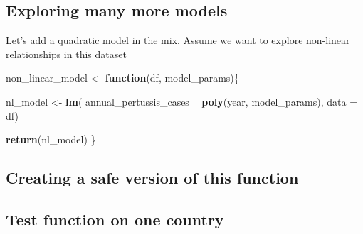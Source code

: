 \documentclass[]{article}
\newenvironment{Shaded}{\begin{snugshade}}{\end{snugshade}}
\newcommand{\KeywordTok}[1]{\textcolor[rgb]{0.13,0.29,0.53}{\textbf{#1}}}
\newcommand{\DataTypeTok}[1]{\textcolor[rgb]{0.13,0.29,0.53}{#1}}
\newcommand{\DecValTok}[1]{\textcolor[rgb]{0.00,0.00,0.81}{#1}}
\newcommand{\StringTok}[1]{\textcolor[rgb]{0.31,0.60,0.02}{#1}}
\newcommand{\ControlFlowTok}[1]{\textcolor[rgb]{0.13,0.29,0.53}{\textbf{#1}}}
\newcommand{\OperatorTok}[1]{\textcolor[rgb]{0.81,0.36,0.00}{\textbf{#1}}}
\newcommand{\NormalTok}[1]{#1}
\begin{document}
\subsection{Exploring many more
models}\label{exploring-many-more-models}

Let's add a quadratic model in the mix. Assume we want to explore
non-linear relationships in this dataset

\begin{Shaded}
\begin{Highlighting}[]
\NormalTok{non_linear_model <-}\StringTok{ }\ControlFlowTok{function}\NormalTok{(df, model_params)\{}
  
\NormalTok{  nl_model <-}\StringTok{ }\KeywordTok{lm}\NormalTok{(}
\NormalTok{    annual_pertussis_cases }\OperatorTok{~}\StringTok{ }\KeywordTok{poly}\NormalTok{(year, }
\NormalTok{                                  model_params),}
                 \DataTypeTok{data =}\NormalTok{ df)}
  
  \KeywordTok{return}\NormalTok{(nl_model)}
\NormalTok{\}}
\end{Highlighting}
\end{Shaded}

\subsection{Creating a safe version of this
function}\label{creating-a-safe-version-of-this-function}

\begin{Shaded}
\end{Shaded}

\subsection{Test function on one
country}\label{test-function-on-one-country}
\end{document}
